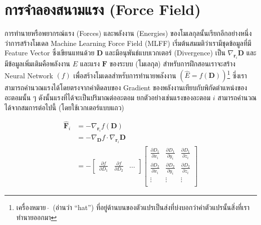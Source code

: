 \autocite{pereira2017,stuke2019,chang2019,rahaman2020,moore2022,ye2022}

\section{การจำลองสนามแรง (Force Field)}
\label{sec:model_ff}

การทำนายหรือพยากรณ์แรง (Forces) และพลังงาน (Energies) ของโมเลกุลนั้นเรียกอีกอย่างหนึ่งว่าการสร้างโมเดล Machine Learning Force Field (MLFF) เริ่มต้นสมมติว่าเรามีชุดข้อมูลที่มี Feature Vector ซึ่งเขียนแทนด้วย $\bm{D}$ และมีอนุพันธ์แบบเวกเตอร์ (Divergence) เป็น $\nabla_{\bm{r}_{i}} \bm{D}$ และมีข้อมูลเพิ่มเติมคือพลังงาน $E$ และแรง $\bm{F}$ ของระบบ (โมเลกุล) สำหรับการฝึกสอนเราจะสร้าง Neural Network $(f)$ เพื่อสร้างโมเดลสำหรับการทำนายพลังงาน $(\hat{E} = f(\bm{D}))$\footnote{เครื่องหมาย\, $\hat{}$\, (อ่านว่า \enquote{hat}) ที่อยู่ด้านบนของตัวแปรเป็นส่งที่บ่งบอกว่าค่าตัวแปรนั้นสิ่งที่เราทำนายออกมา} ซึ่งเราสามารถคำนวณแรงได้โดยตรงจากค่าติดลบของ Gradient ของพลังงานเทียบกับพิกัดตำแหน่งของอะตอมนั้น ๆ ดังนั้นแรงที่ได้จะเป็นปริมาณต่ออะตอม ยกตัวอย่างเช่นแรงของอะตอม $i$ สามารถคำนวณได้จากสมการต่อไปนี้ (โดยใช้เวกเตอร์แบบแถว)

\begin{align}\label{eq:force_pred}
    \hat{\bm{F}}_i & = - \nabla_{\bm{r}_{i}} f(\bm{D})                                                                                                   \\
                   & = - \nabla_{\bm{D}} f \cdot \nabla_{\bm{r}_{i}} \bm{D}                                                                              \\
                   & = - \begin{bmatrix}
                             \frac{\partial f}{\partial D_{1}} & \frac{\partial f}{\partial D_{2}} & \dots
                         \end{bmatrix}
    \begin{bmatrix}
        \frac{\partial D_{1}}{\partial x_{i}} & \frac{\partial D_{1}}{\partial y_i} &
        \frac{\partial D_{1}}{\partial z_i}                                                  \\
        \frac{\partial D_{2}}{\partial x_{i}} & \frac{\partial D_{2}}{\partial y_i} &
        \frac{\partial D_{2}}{\partial z_i}                                                  \\
        \vdots                                & \vdots                              & \vdots \\
    \end{bmatrix}
\end{align}

